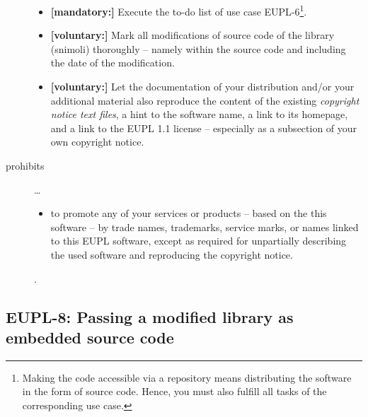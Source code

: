 \begin{description}
\begin{itemize}
  \item \textbf{[mandatory:]} Execute the to-do list of use case EUPL-6\footnote{
  Making the code accessible via a repository means distributing the software in
  the form of source code. Hence, you must also fulfill all tasks of the
  corresponding use case.}.
    
  \item \textbf{[voluntary:]} Mark all modifications of source code of the
  library (snimoli) thoroughly -- namely within the source code and including
  the date of the modification.
  
  \item \textbf{[voluntary:]} Let the documentation of your distribution and/or
  your additional material  also reproduce the content of the existing
  \emph{copyright notice text files}, a hint to the software name, a link to its
  homepage, and a link to the EUPL 1.1 license -- especially as a subsection of
  your own copyright notice.
  
\end{itemize}

\item[prohibits] \ldots
\begin{itemize}
  \item to promote any of your services or products -- based on the this software
  -- by trade names, trademarks, service marks, or names linked to this EUPL
  software, except as required for unpartially describing the used software and
  reproducing the copyright notice.
\end{itemize}.

\end{description}

\subsection{EUPL-8: Passing a modified library as embedded source code}
\label{OSUC-10-EUPL}

